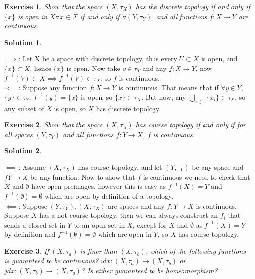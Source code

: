 \documentclass[11pt,a4paper]{article}
\newtheorem{Ex}{Exercise}
\newtheorem{Sol}{Solution}
\begin{document}
\begin{Ex}
	Show that the space $(X, \tau_X)$ has the discrete topology if and only if $\{x\}$ is open in $X \forall x \in X$ if and only if $\forall (Y, \tau_Y)$, and all functions $f: X \rightarrow Y$ are continuous. 
\end{Ex}

\begin{Sol} \end{Sol}
\noindent $\implies$: Let X be a space with discrete topology, thus every $U \subset X$ is open, and $\{x\} \subset X$, hence $\{x\}$ is open. Now take $v \in \tau_Y$ and any $f : X \rightarrow Y$, now $f^{-1}(V) \subset X \implies f^{-1}(V) \in \tau_X$, so $f$ is continuous. \\

\noindent $\impliedby$: Suppose any function $f: X \rightarrow Y$ is continuous. That means that if $\forall y \in Y$, $\{y\} \in \tau_Y$, $f^{-1}(y) = \{x\}$ is open, so $\{x\} \in \tau_X$. But now, any $\bigcup_{i \in I}\{x_i\} \in \tau_X$, so any subset of $X$ is open, so $X$ has discrete topology.

\begin{Ex}
	Show that the space $(X, \tau_X)$ has course topology if and only if for all spaces $(Y, \tau_Y)$ and all functions $f: Y \rightarrow X$, $f$ is continuous. 
\end{Ex}

\begin{Sol} \end{Sol}
\noindent $\implies$: Assume $(X, \tau_X)$ has course topology, and let $(Y, \tau_Y)$ be any space and $f Y \rightarrow X$ be any function. Now to show that $f$ is continuous we need to check that $X$ and $\emptyset$ have open preimages, however this is easy as $f^{-1}(X) = Y$ and $f^{-1}(\emptyset) = \emptyset$ which are open by definition of a topology. \\
\noindent $\impliedby$: Suppose $(Y, \tau_Y), (X, \tau_X)$ are spaces and any $f: Y \rightarrow X$ is continuous. Suppose $X$ has a not course topology, then we can always construct an $f_i$ that sends a closed set in $Y$ to an open set in $X$, except for $X$ and $\emptyset$ as $f^{-1}(X) = Y$ by definition and $f^{-1}(\emptyset) = \emptyset$ which are open in $Y$, so $X$ has course topology.
\begin{Ex}
	If $(X, \tau_a)$ is finer than $(X, \tau_b)$, which of the following functions is guaranteed to be continuous? $idx : (X , \tau_a) \rightarrow (X, \tau_b)$ or $jdx : (X , \tau_b) \rightarrow (X, \tau_a)$? Is either guaranteed to be homeomorphism?
\end{Ex}
\end{document}
